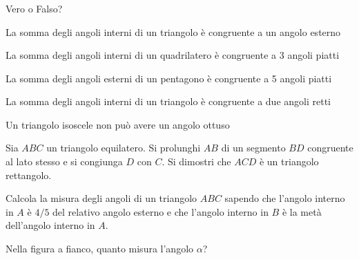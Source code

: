 \subsubsection*{}

\begin{esercizio}
\label{ese:3.47}
Vero o Falso?
\begin{enumeratea}
\item La somma degli angoli interni di un triangolo è congruente a un 
angolo esterno \hfill\boxV\quad\boxF
\item La somma degli angoli interni di un quadrilatero è congruente a 
3 angoli piatti \hfill\boxV\quad\boxF
\item La somma degli angoli esterni di un pentagono è congruente a 5 
angoli piatti\hfill\boxV\quad\boxF
\item La somma degli angoli interni di un triangolo è congruente a 
due angoli retti\hfill\boxV\quad\boxF
\item Un triangolo isoscele non può avere un angolo 
ottuso\hfill\boxV\quad\boxF
\end{enumeratea}
\end{esercizio}

\begin{minipage}{.69\textwidth}
 \begin{esercizio}
\label{ese:3.48}
Sia $ABC$ un triangolo equilatero. Si prolunghi $AB$ di un segmento 
$BD$ congruente al lato stesso e si congiunga $D$ con $C$. Si 
dimostri che $ACD$ è un triangolo rettangolo.
\end{esercizio}

\begin{esercizio}
\label{ese:3.49}
Calcola la misura degli angoli di un triangolo $ABC$ sapendo che 
l'angolo interno in $A$ è $4/5$ del relativo angolo esterno e che 
l'angolo interno in $B$ è la metà dell'angolo interno in $A$.
\end{esercizio}

\begin{esercizio}
\label{ese:3.51}
Nella figura a fianco, quanto misura l'angolo $\alpha$?
\end{esercizio}
\end{minipage}  
\begin{minipage}{.29\textwidth}
\vspace{-20mm}
\begin{inaccessibleblock}
\begin{center}\end{center}
\end{inaccessibleblock}
\end{minipage}

